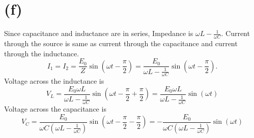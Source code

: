 \documentclass[12pt]{article}
\begin{document}
\section*{(f)}
Since capacitance and inductance are in series, Impedance is \(\omega{L}-\frac{1}{\omega{C}}. \)
Current through the source is same as current through the capacitance and current through the inductance.
\[I_1=I_2=\frac{E_0}{Z}\sin{\left(\omega{t}-\frac{\pi}{2} \right )}=\frac{E_0}{\omega{L}-\frac{1}{\omega{C}}}\sin{\left(\omega{t}-\frac{\pi}{2} \right )}.\]
Voltage across the inductance is \[V_L=\frac{E_0\omega{L}}{\omega{L}-\frac{1}{\omega{C}}}\sin{\left(\omega{t}-\frac{\pi}{2}+\frac{\pi}{2} \right )}=\frac{E_0\omega{L}}{\omega{L}-\frac{1}{\omega{C}}}\sin{\left(\omega{t}\right )}\]
Voltage across the capacitance is \[V_C=\frac{E_0}{\omega{C}\left(\omega{L}-\frac{1}{\omega{C}} \right )}\sin{\left(\omega{t}-\frac{\pi}{2}-\frac{\pi}{2} \right )}=-\frac{E_0}{\omega{C}\left(\omega{L}-\frac{1}{\omega{C}} \right )}\sin{\left(\omega{t}\right )}\]
\end{document}
